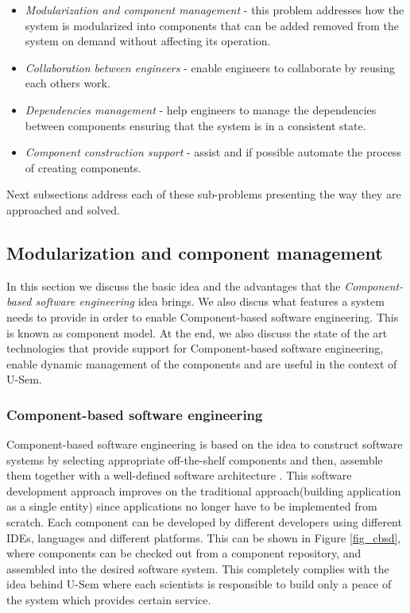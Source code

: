 \begin{itemize}
	\item \textit{Modularization and component management} - this problem addresses how the system is modularized into components that can be added removed from the system on demand without affecting its operation.
	\item \textit{Collaboration between engineers} - enable engineers to collaborate by reusing each others work.
	\item \textit{Dependencies management} - help engineers to manage the dependencies between components ensuring that the system is in a consistent state.
	\item \textit{Component construction support} - assist and if possible automate the process of creating components.
\end{itemize}

Next subsections address each of these sub-problems presenting the way they are approached and solved. 

\subsection{Modularization and component management}

In this section we discuss the basic idea and the advantages that the \textit{Component-based software engineering} idea brings. We also discus what features a system needs to provide in order to enable Component-based software engineering. This is known as component model. At the end, we also discuss the state of the art technologies that provide support for Component-based software engineering, enable dynamic management of the components and are useful in the context of U-Sem. 

\subsubsection{Component-based software engineering}

Component-based software engineering is based on the idea to construct software systems by selecting appropriate off-the-shelf components and then, assemble them together with a well-defined software architecture \cite{pour1998component}. This software development approach improves on the traditional approach(building application as a single entity) since applications no longer have to be implemented from scratch. Each component can be developed by different developers using different IDEs, languages and different platforms. This can be shown in Figure \ref{fig_cbsd}, where components can be checked out from a component repository, and assembled into the desired software system. This completely complies with the idea behind U-Sem where each scientists is responsible to build only a peace of the system which provides certain service.

